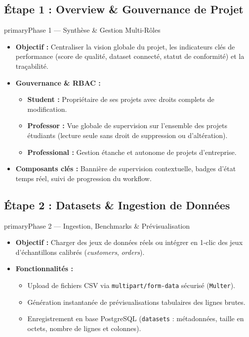 \documentclass[11pt,a4paper]{article}
\begin{document}
\vspace{10pt}


\subsection*{Étape 1 : Overview \& Gouvernance de Projet}
\begin{stepbox}{primary}{Phase 1 — Synthèse \& Gestion Multi-Rôles}
\begin{itemize}
    \item \textbf{Objectif :} Centraliser la vision globale du projet, les indicateurs clés de performance (score de qualité, dataset connecté, statut de conformité) et la traçabilité.
    \item \textbf{Gouvernance \& RBAC :}
    \begin{itemize}
        \item \textbf{Student :} Propriétaire de ses projets avec droits complets de modification.
        \item \textbf{Professor :} Vue globale de supervision sur l'ensemble des projets étudiants (lecture seule sans droit de suppression ou d'altération).
        \item \textbf{Professional :} Gestion étanche et autonome de projets d'entreprise.
    \end{itemize}
    \item \textbf{Composants clés :} Bannière de supervision contextuelle, badges d'état temps réel, suivi de progression du workflow.
\end{itemize}
\end{stepbox}

\subsection*{Étape 2 : Datasets \& Ingestion de Données}
\begin{stepbox}{primary}{Phase 2 — Ingestion, Benchmarks \& Prévisualisation}
\begin{itemize}
    \item \textbf{Objectif :} Charger des jeux de données réels ou intégrer en 1-clic des jeux d'échantillons calibrés (\textit{customers}, \textit{orders}).
    \item \textbf{Fonctionnalités :}
    \begin{itemize}
        \item Upload de fichiers CSV via \texttt{multipart/form-data} sécurisé (\texttt{Multer}).
        \item Génération instantanée de prévisualisations tabulaires des lignes brutes.
        \item Enregistrement en base PostgreSQL (\texttt{datasets} : métadonnées, taille en octets, nombre de lignes et colonnes).
    \end{itemize}
\end{itemize}
\end{stepbox}
\end{document}
